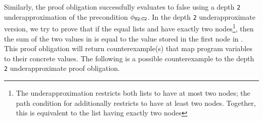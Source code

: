 Similarly, the proof obligation 
successfully evaluates to false using a depth {\tt 2} underapproximation of the precondition $\phi_{{\tt S2:C2}}$.
In the depth {\tt 2} underapproximate version, we try to prove that
if the equal lists  and  have exactly two
nodes\footnote{The underapproximation
restricts both lists to have at most
two nodes; the path condition for  additionally
restricts  to have at least two nodes. Together, this is equivalent to the list having
exactly two nodes}, then the sum of the two values in  is equal to the
value stored in the first node in .
This proof obligation will return counterexample(s) that
map program variables to their concrete values.
The following is a possible counterexample to the depth {\tt 2} underapproximate
proof obligation.


